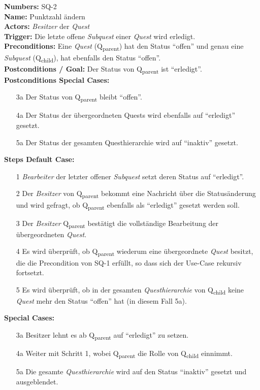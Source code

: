 \documentclass{article}
\begin{document}
\newpage

\begin{samepage}
	\textbf{Numbers:} SQ-2\\
	\textbf{Name:} Punktzahl ändern\\
	\textbf{Actors:} \textit{Besitzer} der \textit{Quest}\\
	\textbf{Trigger:} Die letzte offene \textit{Subquest} einer \textit{Quest} wird erledigt.\\
	\textbf{Preconditions:} Eine \textit{Quest} (Q\textsubscript{parent}) hat den Status ``offen'' und genau eine \textit{Subquest} (Q\textsubscript{child}), hat ebenfalls den Status ``offen''. \\
	\textbf{Postconditions / Goal:} Der Status von Q\textsubscript{parent} ist ``erledigt''. \\
	\textbf{Postconditions Special Cases:} 
	\begin{itemize}
		\item[3a] Der Status von Q\textsubscript{parent} bleibt ``offen''. 
		\item[4a] Der Status der übergeordneten Quests wird ebenfalls auf ``erledigt'' gesetzt. 
		\item[5a] Der Status der gesamten Questhierarchie wird auf ``inaktiv'' gesetzt.
	\end{itemize}
	\textbf{Steps Default Case:}
	\begin{itemize}
		\item[1] \textit{Bearbeiter} der letzter offener \textit{Subquest} setzt deren Status auf ``erledigt''.
		\item[2] Der \textit{Besitzer} von Q\textsubscript{parent} bekommt eine Nachricht über die Statusänderung und wird gefragt, ob Q\textsubscript{parent} ebenfalls  als ``erledigt'' gesetzt werden soll.
		\item[3] Der \textit{Besitzer} Q\textsubscript{parent} bestätigt die vollständige Bearbeitung der übergeordneten \textit{Quest}.
		\item[4] Es wird überprüft, ob Q\textsubscript{parent} wiederum eine übergeordnete \textit{Quest} besitzt, die die Precondition von SQ-1 erfüllt, so dass sich der Use-Case rekursiv fortsetzt. 
		\item[5] Es wird überprüft, ob in der gesamten \textit{Questhierarchie} von Q\textsubscript{child} keine \textit{Quest} mehr den Status ``offen'' hat (in diesem Fall 5a). 
	\end{itemize}
	\textbf{Special Cases:}
	\begin{itemize}
	\item [3a] Besitzer lehnt es ab  Q\textsubscript{parent} auf ``erledigt'' zu setzen.
	\item [4a] Weiter mit Schritt 1, wobei Q\textsubscript{parent} die Rolle von Q\textsubscript{child} einnimmt. 
	\item [5a] Die gesamte \textit{Questhierarchie} wird auf den Status ``inaktiv'' gesetzt und ausgeblendet. 
	\end{itemize}
	\end{samepage}
\end{document}

